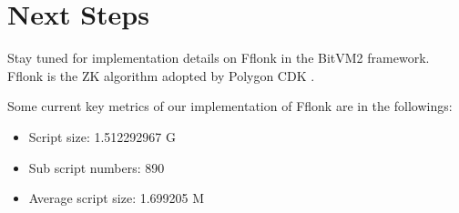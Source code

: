 \section{Next Steps}

Stay tuned for implementation details on Fflonk \cite{website:Fflonk} in the BitVM2 framework. Fflonk is the ZK algorithm adopted by Polygon CDK \cite{website:Polygon-CDK}.

Some current key metrics of our implementation of Fflonk are in the followings: 
\begin{itemize}
    \item Script size: 1.512292967 G
    \item Sub script numbers: 890
    \item Average script size: 1.699205 M
\end{itemize}
    
